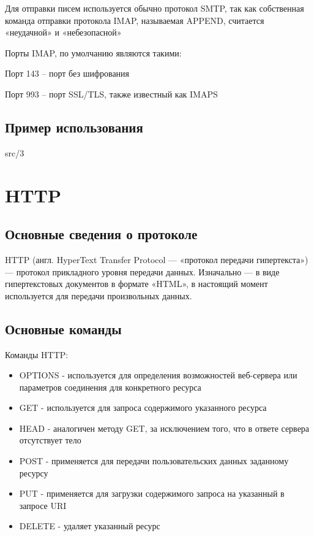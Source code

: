 Для отправки писем используется обычно протокол SMTP, так как собственная команда отправки протокола IMAP, называемая APPEND, считается «неудачной» и «небезопасной»

Порты IMAP, по умолчанию являются такими:

    Порт 143 – порт без шифрования
    
    Порт 993 – порт SSL/TLS, также известный как IMAPS

\subsection{Пример использования}
 {src/3}

\section{HTTP}

\subsection{Основные сведения о протоколе}
HTTP (англ. HyperText Transfer Protocol — «протокол передачи гипертекста») — протокол прикладного уровня передачи данных. Изначально — в виде гипертекстовых документов в формате «HTML», в настоящий момент используется для передачи произвольных данных. 

\subsection{Основные команды}
Команды HTTP:
\begin{itemize}
\item OPTIONS - используется для определения возможностей веб-сервера или параметров соединения для конкретного ресурса
\item GET - используется для запроса содержимого указанного ресурса
\item HEAD - аналогичен методу GET, за исключением того, что в ответе сервера отсутствует тело
\item POST - применяется для передачи пользовательских данных заданному ресурсу
\item PUT - применяется для загрузки содержимого запроса на указанный в запросе URI
\item DELETE - удаляет указанный ресурс
\end{itemize}

